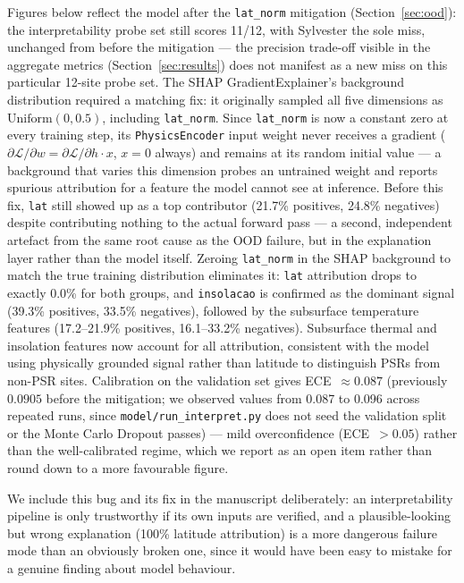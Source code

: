 \documentclass[12pt,a4paper]{article}
\begin{document}
Figures below reflect the model after the \texttt{lat\_norm} mitigation
(Section~\ref{sec:ood}): the interpretability probe set still scores 11/12,
with Sylvester the sole miss, unchanged from before the mitigation — the
precision trade-off visible in the aggregate metrics (Section~\ref{sec:results})
does not manifest as a new miss on this particular 12-site probe set. The SHAP
GradientExplainer's background distribution required a matching fix: it
originally sampled all five dimensions as $\mathrm{Uniform}(0, 0.5)$, including
\texttt{lat\_norm}. Since \texttt{lat\_norm} is now a constant zero at every
training step, its \texttt{PhysicsEncoder} input weight never receives a
gradient ($\partial \mathcal{L}/\partial w = \partial \mathcal{L}/\partial h
\cdot x$, $x=0$ always) and remains at its random initial value — a background
that varies this dimension probes an untrained weight and reports spurious
attribution for a feature the model cannot see at inference. Before this fix,
\texttt{lat} still showed up as a top contributor (21.7\% positives, 24.8\%
negatives) despite contributing nothing to the actual forward pass — a second,
independent artefact from the same root cause as the OOD failure, but in the
explanation layer rather than the model itself. Zeroing \texttt{lat\_norm} in
the SHAP background to match the true training distribution eliminates it:
\texttt{lat} attribution drops to exactly 0.0\% for both groups, and
\texttt{insolacao} is confirmed as the dominant signal (39.3\% positives,
33.5\% negatives), followed by the subsurface temperature features
(17.2--21.9\% positives, 16.1--33.2\% negatives). Subsurface thermal and
insolation features now account for all attribution, consistent with the model
using physically grounded signal rather than latitude to distinguish PSRs from
non-PSR sites. Calibration on the validation set gives ECE~$\approx 0.087$
(previously $0.0905$ before the mitigation; we observed values from 0.087 to
0.096 across repeated runs, since \texttt{model/run\_interpret.py} does not
seed the validation split or the Monte Carlo Dropout passes) — mild
overconfidence (ECE~$>0.05$) rather than the well-calibrated regime, which we
report as an open item rather than round down to a more favourable figure.

We include this bug and its fix in the manuscript deliberately: an
interpretability pipeline is only trustworthy if its own inputs are verified,
and a plausible-looking but wrong explanation (100\% latitude attribution) is a
more dangerous failure mode than an obviously broken one, since it would have
been easy to mistake for a genuine finding about model behaviour.
\end{document}
